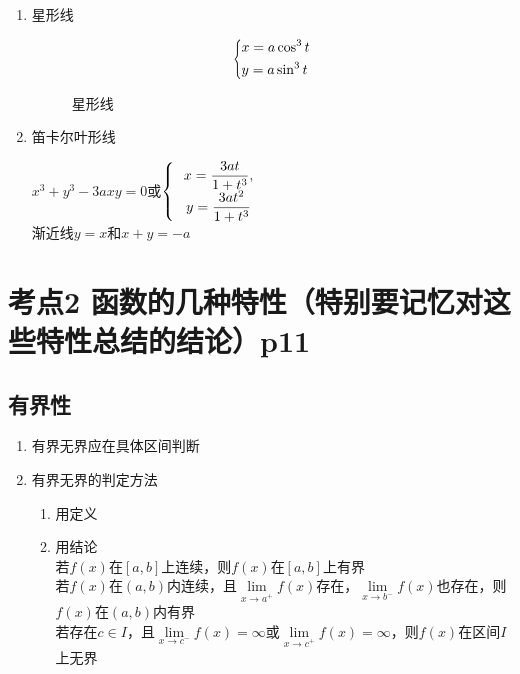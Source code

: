 \begin{enumerate}
    \item 星形线\par
    \begin{equation*}
        \scaleleftright[6pt]{\biggl\{}{
        \begin{aligned}
        & x=a\cos^{3}t \\
        & y=a\sin^{3}t
        \end{aligned}
        }{.}
    \end{equation*}
    \begin{figure}[H]
        \centering
        \caption{星形线}
    \end{figure}

    \item 笛卡尔叶形线\par
    {
        $  x^3+y^3-3axy=0$或$\left\{ \begin{array}{cl}
            \displaystyle\hspace{.2em}x=\frac{3at}{1+t^3},\\
            \displaystyle\hspace{.2em} y=\frac{3at^2}{1+t^3}
        \end{array}\right.$
    }\\
    渐近线$y=x$和$x+y=-a$
\end{enumerate}


\section{考点2 函数的几种特性（特别要记忆对这些特性总结的结论）p11}

\subsection{有界性}

\begin{enumerate}
    \item 有界无界应在具体区间判断
    \item 有界无界的判定方法\begin{enumerate}
        \item 用定义
        \item 用结论\\
        若$f(x)$在$[a,b]$上连续，则$f(x)$在$[a,b]$上有界\\
        若$f(x)$在$(a,b)$内连续，且$\lim \limits_{x\to a^+}f(x)$存在，$\lim \limits_{x\to b^-}f(x)$也存在，则$f(x)$在$(a,b)$内有界\\
        若存在$c\in I$，且$\lim \limits_{x\to c^-}f(x)=\infty$或$\lim \limits_{x\to c^+}f(x)=\infty$，则$f(x)$在区间$I$上无界
    \end{enumerate}
\end{enumerate}

